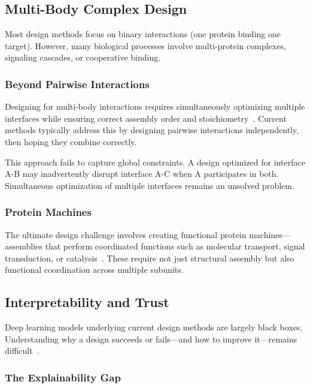 \subsection{Multi-Body Complex Design}
\label{subsec:multibody}

Most design methods focus on binary interactions (one protein binding one target). However, many biological processes involve multi-protein complexes, signaling cascades, or cooperative binding.

\subsubsection{Beyond Pairwise Interactions}

Designing for multi-body interactions requires simultaneously optimizing multiple interfaces while ensuring correct assembly order and stoichiometry~\cite{bennett2024symmetric}. Current methods typically address this by designing pairwise interactions independently, then hoping they combine correctly.

This approach fails to capture global constraints. A design optimized for interface A-B may inadvertently disrupt interface A-C when A participates in both. Simultaneous optimization of multiple interfaces remains an unsolved problem.

\subsubsection{Protein Machines}

The ultimate design challenge involves creating functional protein machines---assemblies that perform coordinated functions such as molecular transport, signal transduction, or catalysis~\cite{krishna2024rfaa}. These require not just structural assembly but also functional coordination across multiple subunits.

\subsection{Interpretability and Trust}
\label{subsec:interpretability}

Deep learning models underlying current design methods are largely black boxes. Understanding why a design succeeds or fails---and how to improve it---remains difficult~\cite{ruffolo2022deepab}.

\subsubsection{The Explainability Gap}

